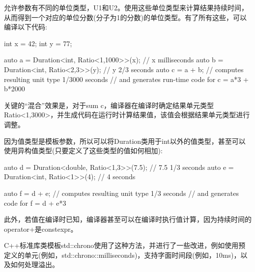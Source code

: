 允许参数有不同的单位类型，U1和U2。使用这些单位类型来计算结果持续时间，从而得到一个对应的单位分数(分子为1的分数)的单位类型。有了所有这些，可以编译以下代码:

\begin{cpp}
int x = 42;
int y = 77;

auto a = Duration<int, Ratio<1,1000>>(x); // x milliseconds
auto b = Duration<int, Ratio<2,3>>(y); // y 2/3 seconds
auto c = a + b; // computes resulting unit type 1/3000 seconds
				// and generates run-time code for c = a*3 + b*2000
\end{cpp}

关键的“混合”效果是，对于sum c，编译器在编译时确定结果单元类型Ratio<1,3000>，并生成代码在运行时计算结果值，该值会根据结果单元类型进行调整。

因为值类型是模板参数，所以可以将Duration类用于int以外的值类型，甚至可以使用异构值类型(只要定义了这些类型的值如何相加):

\begin{cpp}
auto d = Duration<double, Ratio<1,3>>(7.5); // 7.5 1/3 seconds
auto e = Duration<int, Ratio<1>>(4); // 4 seconds

auto f = d + e; // computes resulting unit type 1/3 seconds
				// and generates code for f = d + e*3
\end{cpp}

此外，若值在编译时已知，编译器甚至可以在编译时执行值计算，因为持续时间的operator+是constexpr。

C++标准库类模板std::chrono使用了这种方法，并进行了一些改进，例如使用预定义的单元(例如，std::chrono::milliseconds)，支持字面时间段(例如，10ms)，以及如何处理溢出。































